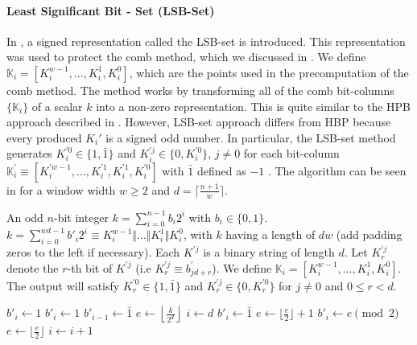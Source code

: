 \paragraph{Least Significant Bit - Set (LSB-Set)}
In \cite{feng2005efficient}, a signed representation called the LSB-set is introduced.
This representation was used to protect the comb method, which we discussed in .
We define $\mathbb{K}_i = \left[ K_i^{w-1}, \ldots, K_i^1, K_i^0 \right]$, which are the points used in the precomputation of the comb method.
The method works by transforming all of the comb bit-columns $\{\mathbb{K}_i \}$ of a scalar $k$ into a non-zero representation.
This is quite similar to the HPB approach described in \cite{hedabou2004comb}.
However, LSB-set approach differs from HBP because every produced $K_i '$ is a signed odd number.
In particular, the LSB-set method generates $K_i^{'0} \in \{1, \bar{1}\}$ and $K_{i}^{'j} \in \{0, K_i^{'0} \}$, $j \neq 0$ for each bit-column $\mathbb{K}_i^{'} \equiv \left[  K_{i}^{' w-1}, \ldots, K_{i}^{'1}, K_{i}^{'1}, K_{i}^{'0} \right]$ with $\bar{1}$ defined as $-1$ \cite{feng2005efficient}. The algorithm can be seen in  for a window width $w \ge 2$ and $d = \lceil \frac{n + 1}{w}\rceil$.
%
\begin{algorithm}
	\algorithmicrequire An odd $n$-bit integer $k = \sum_{i = 0}^{n - 1}b_i 2^i$ with $b_i \in \{0, 1\}$. \\
	\algorithmicensure $k = \sum_{i = 0}^{wd - 1} b'_i 2^i \equiv K_i^{w-1} \Vert \ldots \Vert K_i^1 \Vert K_i^0$, with $k$ having a length of $dw$ (add padding zeros to the left if necessary). Each $K^{'j}$ is a binary string of length $d$. Let $K_r^{'j}$ denote the $r$-th bit of $K^{'j}$ (i.e $K_r^{'j} \equiv b_{jd + r}^{'}$).
	We define $\mathbb{K}_i = \left[ K_i^{w-1}, \ldots, K_i^1, K_i^0 \right]$.  The output will satisfy $K_r^{'0} \in \{1, \bar{1}\}$ and $K_r^{'j} \in \{0, K_r^{'0} \}$ for $j \neq 0$ and $0 \le r < d$.
	\begin{algorithmic}[1]
				\State $b'_i \gets 1$
			\Else 
				\State $b'_i \gets 1$
				\State $b'_{i - 1} \gets \bar{1}$
			\EndIf
		\EndFor
		\State $e \gets \left\lfloor \frac{k}{2^d} \right\rfloor$
		\State $i \gets d$
				\State $b'_i \gets \bar{1}$
				\State $e \gets \lfloor \frac{e}{2} \rfloor + 1$
			\Else
				\State $b'_i \gets e \pmod{2}$
				\State $e \gets \lfloor \frac{e}{2}\rfloor$
			\EndIf
			\State $i \gets i + 1$
		\EndWhile
	\end{algorithmic}
	\label{algo: Signed Odd-Only Comb Recoding Algorithm for an Odd Scalar}
\end{algorithm}
